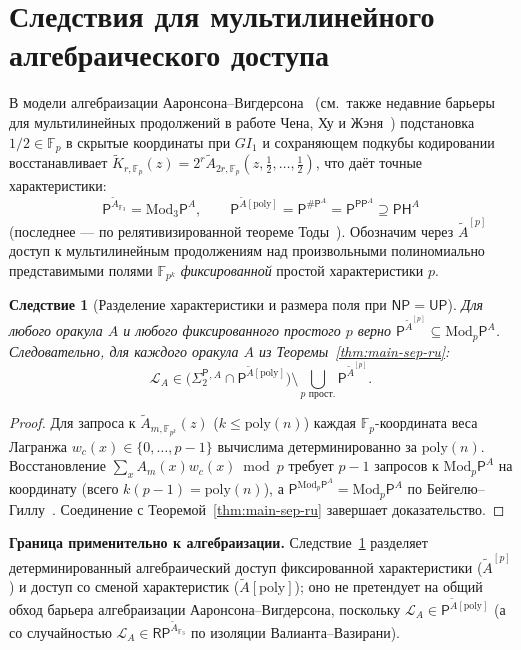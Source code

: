 \documentclass[11pt,a4paper]{article}
\newtheorem{corollary}[theorem]{Следствие}
\theoremstyle{definition}
\theoremstyle{remark}
\newcommand{\Pcl}{\mathsf{P}}
\newcommand{\NP}{\mathsf{NP}}
\newcommand{\UP}{\mathsf{UP}}
\newcommand{\PP}{\mathsf{PP}}
\newcommand{\PH}{\mathsf{PH}}
\newcommand{\Modp}{\mathrm{Mod}_p\mathsf{P}}
\newcommand{\Modthree}{\mathrm{Mod}_3\mathsf{P}}
\newcommand{\SharpP}{\#\mathsf{P}}
\newcommand{\SigTwo}{\Sigma_2^{\mathsf{P}}}
\newcommand{\F}{\mathbb{F}}
\newcommand{\GI}{GI_1}
\begin{document}
\section{Следствия для мультилинейного алгебраического доступа}

В модели алгебраизации Ааронсона--Вигдерсона~\cite{AaronsonWigderson2009} (см.\ также недавние барьеры для мультилинейных продолжений в работе Чена, Ху и Жэня~\cite{ChenHuRen2026}) подстановка $1/2 \in \F_p$ в скрытые координаты при $\GI$ и сохраняющем подкубы кодировании восстанавливает $\widetilde{K}_{r,\F_p}(z) = 2^r \widetilde{A}_{2r,\F_p}(z, \tfrac12, \dots, \tfrac12)$, что даёт точные характеристики:
\[
  \Pcl^{\widetilde{A}_{\F_3}} = \Modthree^A,
  \qquad
  \Pcl^{\widetilde{A}[\mathrm{poly}]} = \Pcl^{\SharpP^A} = \Pcl^{\PP^A} \supseteq \PH^A
\]
(последнее — по релятивизированной теореме Тоды~\cite{Toda1991}). Обозначим через $\widetilde{A}^{[p]}$ доступ к мультилинейным продолжениям над произвольными полиномиально представимыми полями $\F_{p^k}$ \emph{фиксированной} простой характеристики $p$.

\begin{corollary}[Разделение характеристики и размера поля при $\NP = \UP$]
\label{cor:char-sep-ru}
Для любого оракула $A$ и любого фиксированного простого $p$ верно $\Pcl^{\widetilde{A}^{[p]}} \subseteq \Modp^A$. Следовательно, для каждого оракула $A$ из Теоремы~\ref{thm:main-sep-ru}:
\[
  \mathcal{L}_A \in \bigl(\SigTwo{}^{,A} \cap \Pcl^{\widetilde{A}[\mathrm{poly}]}\bigr)
  \setminus \bigcup_{p\text{ прост.}} \Pcl^{\widetilde{A}^{[p]}}.
\]
\end{corollary}

\begin{proof}
Для запроса к $\widetilde{A}_{m,\F_{p^k}}(z)$ ($k \le \mathrm{poly}(n)$) каждая $\F_p$-координата веса Лагранжа $w_c(x) \in \{0,\dots,p-1\}$ вычислима детерминированно за $\mathrm{poly}(n)$. Восстановление $\sum_x A_m(x) w_c(x) \bmod p$ требует $p-1$ запросов к $\Modp^A$ на координату (всего $k(p-1) = \mathrm{poly}(n)$), а $\Pcl^{\Modp^A} = \Modp^A$ по Бейгелю--Гиллу~\cite{BeigelGill1992}. Соединение с Теоремой~\ref{thm:main-sep-ru} завершает доказательство.
\end{proof}
\textbf{Граница применительно к алгебраизации.} Следствие~\ref{cor:char-sep-ru} разделяет детерминированный алгебраический доступ фиксированной характеристики ($\widetilde{A}^{[p]}$) и доступ со сменой характеристик ($\widetilde{A}[\mathrm{poly}]$); оно не претендует на общий обход барьера алгебраизации Ааронсона--Вигдерсона, поскольку $\mathcal{L}_A \in \Pcl^{\widetilde{A}[\mathrm{poly}]}$ (а со случайностью $\mathcal{L}_A \in \mathsf{RP}^{\widetilde{A}_{\F_3}}$ по изоляции Валианта--Вазирани).
\end{document}
